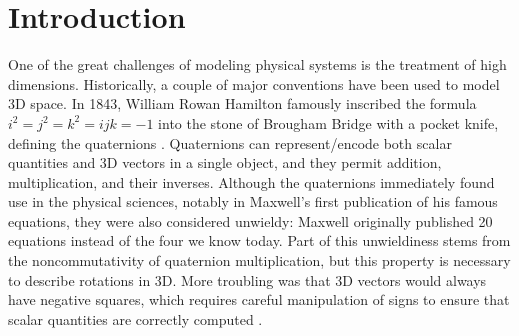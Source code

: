 \documentclass{juliacon}
\begin{document}


\maketitle

\begin{abstract}

Vector algebra, with its familiar cross product and dot product operations, has long been the \textit{lingua franca} of physics and 3D geometry, mostly replacing the older quaternion formalism.
While vector algebra managed to clean up some of the informal aspects of quaternions, it also introduced its own issues, particularly with the cross product, and remains limited to describing 3D space like the quaternions.
An alternative formalism, \textit{geometric algebra}, or \textit{Clifford algebra}, generalizes the geometric concepts of vector algebra, quaternions, complex numbers, and dual numbers to any number of dimensions, and offers greater conceptual clarity for learners. In service of the goal of making geometric algebra more accessible to the broader community, {\tt CliffordNumbers.jl} provides a first-class numerical implementation of geometric algebras in Julia.
Here, we provide an introduction to geometric algebra for those not familiar with the topic, and provide details about the architecture of {\tt CliffordNumbers.jl}, as well as usage examples.

\end{abstract}

\section{Introduction}

One of the great challenges of modeling physical systems is the treatment of high dimensions.
Historically, a couple of major conventions have been used to model 3D space.
In 1843, William Rowan Hamilton famously inscribed the formula $i^2 = j^2 = k^2 = ijk = -1$  into the stone of Brougham Bridge with a pocket knife, defining the quaternions \cite{hamilton-quaternions}.
Quaternions can represent/encode both scalar quantities and 3D vectors in a single object, and they permit addition, multiplication, and their inverses. Although the quaternions immediately found use in the physical sciences, notably in Maxwell's first publication of his famous equations, they were also considered unwieldy: Maxwell originally published 20 equations instead of the four we know today. Part of this unwieldiness stems from the noncommutativity of quaternion multiplication, but this property is necessary to describe rotations in 3D. More troubling was that 3D vectors would always have negative squares, which requires careful manipulation of signs to ensure that scalar quantities are correctly computed \cite{vector-algebra-war}.
\end{document}
